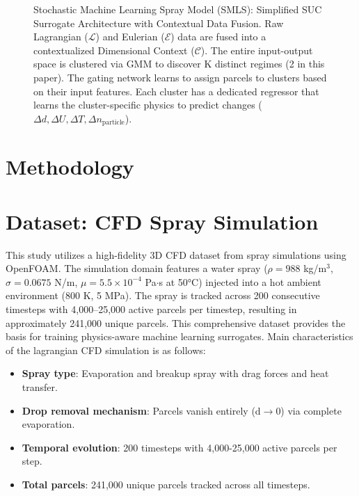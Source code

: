 \documentclass[letterpaper,twocolumn,10pt]{article}
\begin{document}
\begin{figure}[h!]
    \caption{Stochastic Machine Learning Spray Model (SMLS): Simplified SUC Surrogate Architecture with Contextual Data Fusion.
     Raw Lagrangian ($\mathcal{L}$) and Eulerian ($\mathcal{E}$) data are fused into a contextualized Dimensional 
     Context ($\mathcal{C}$). The entire input-output space is clustered via GMM to discover 
     K distinct regimes (2 in this paper). The gating network learns to assign parcels to clusters based on their input features. 
     Each cluster has a dedicated regressor that learns the cluster-specific physics to 
     predict changes ($\Delta d, \Delta U, \Delta T, \Delta n_{\text{particle}}$).}
    \label{fig:full_arch}
\end{figure}

\section{Methodology}



\section{Dataset: CFD Spray Simulation}

This study utilizes a high-fidelity 3D CFD dataset from spray simulations using OpenFOAM. The simulation domain features a water spray ($\rho=988$ kg/m$^3$, $\sigma=0.0675$ N/m, $\mu=5.5 \times 10^{-4}$ Pa$\cdot$s at 50°C) injected into a hot ambient environment (800 K, 5 MPa). The spray is tracked across 200 consecutive timesteps with 4,000--25,000 active parcels per timestep, resulting in approximately 241,000 unique parcels. This comprehensive dataset provides the basis for training physics-aware machine learning surrogates. Main characteristics of the lagrangian CFD simulation is as follows:
\begin{itemize}
    \item \textbf{Spray type}: Evaporation and breakup spray with drag forces and heat transfer.
    \item \textbf{Drop removal mechanism}: Parcels vanish entirely (d$\to$0) via complete evaporation.
    \item \textbf{Temporal evolution}: 200 timesteps with 4,000-25,000 active parcels per step.
    \item \textbf{Total parcels}: 241,000 unique parcels tracked across all timesteps.
\end{itemize}
\end{document}
